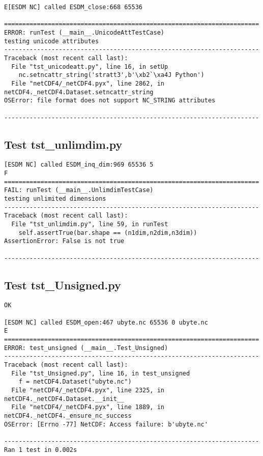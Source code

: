\begin{verbatim}
E[ESDM NC] called ESDM_close:668 65536

======================================================================
ERROR: runTest (__main__.UnicodeAttTestCase)
testing unicode attributes
----------------------------------------------------------------------
Traceback (most recent call last):
  File "tst_unicodeatt.py", line 16, in setUp
    nc.setncattr_string('stratt3',b'\xb2`\xa4J Python')
  File "netCDF4/_netCDF4.pyx", line 2862, in netCDF4._netCDF4.Dataset.setncattr_string
OSError: file format does not support NC_STRING attributes

----------------------------------------------------------------------
\end{verbatim}

\subsection{Test tst\_unlimdim.py}

\begin{verbatim}
[ESDM NC] called ESDM_inq_dim:969 65536 5
F
======================================================================
FAIL: runTest (__main__.UnlimdimTestCase)
testing unlimited dimensions
----------------------------------------------------------------------
Traceback (most recent call last):
  File "tst_unlimdim.py", line 59, in runTest
    self.assertTrue(bar.shape == (n1dim,n2dim,n3dim))
AssertionError: False is not true

----------------------------------------------------------------------
\end{verbatim}

\subsection{Test tst\_Unsigned.py}

\begin{verbatim}
OK

[ESDM NC] called ESDM_open:467 ubyte.nc 65536 0 ubyte.nc
E
======================================================================
ERROR: test_unsigned (__main__.Test_Unsigned)
----------------------------------------------------------------------
Traceback (most recent call last):
  File "tst_Unsigned.py", line 16, in test_unsigned
    f = netCDF4.Dataset("ubyte.nc")
  File "netCDF4/_netCDF4.pyx", line 2325, in netCDF4._netCDF4.Dataset.__init__
  File "netCDF4/_netCDF4.pyx", line 1889, in netCDF4._netCDF4._ensure_nc_success
OSError: [Errno -77] NetCDF: Access failure: b'ubyte.nc'

----------------------------------------------------------------------
Ran 1 test in 0.002s
\end{verbatim}

